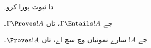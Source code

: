 \documentclass[../../../include/open-logic-section]{subfiles}
\begin{document}
\begin{prob}
 دا ثبوت پورا کرو۔
\end{prob}

\begin{cor}
جے $\Gamma \Entails !A$، تاں $\Gamma \Proves !A$۔
\end{cor}

\begin{cor}
جے $!A$ سارے نمونیاں وچ سچ اے، تاں $\Proves !A$۔
\end{cor}
\end{document}
